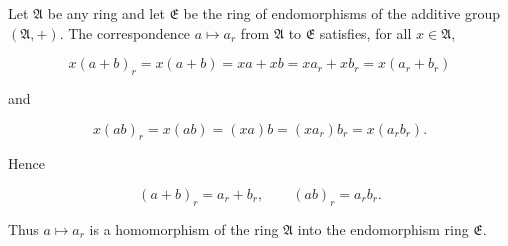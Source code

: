 Let $\mathfrak{A}$ be any ring and let $\mathfrak{E}$ be the ring of endomorphisms of the additive group $(\mathfrak{A}, +)$. The correspondence $a \mapsto a_r$ from $\mathfrak{A}$ to $\mathfrak{E}$ satisfies, for all $x \in \mathfrak{A}$,

$$x(a + b)_r = x(a + b) = xa + xb = xa_r + xb_r = x(a_r + b_r)$$

and

$$x(ab)_r = x(ab) = (xa)b = (xa_r)b_r = x(a_r b_r).$$

Hence

$$(a + b)_r = a_r + b_r, \qquad (ab)_r = a_r b_r.$$

Thus $a \mapsto a_r$ is a homomorphism of the ring $\mathfrak{A}$ into the endomorphism ring $\mathfrak{E}$.
